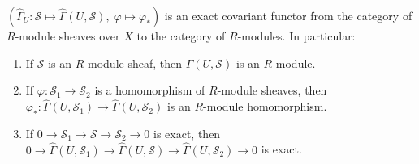 $(\hat{\Gamma}_U : \mathcal{S} \mapsto \hat{\Gamma}(U, \mathcal{S}),\; \varphi \mapsto \varphi_*)$ is an exact covariant functor from the category of $R$-module sheaves over $X$ to the category of $R$-modules. In particular:
\begin{enumerate}
\item If $\mathcal{S}$ is an $R$-module sheaf, then $\hat{\Gamma}(U, \mathcal{S})$ is an $R$-module.
\item If $\varphi : \mathcal{S}_1 \to \mathcal{S}_2$ is a homomorphism of $R$-module sheaves, then $\varphi_* : \hat{\Gamma}(U, \mathcal{S}_1) \to \hat{\Gamma}(U, \mathcal{S}_2)$ is an $R$-module homomorphism.
\item If $0 \to \mathcal{S}_1 \to \mathcal{S} \to \mathcal{S}_2 \to 0$ is exact, then $0 \to \hat{\Gamma}(U, \mathcal{S}_1) \to \hat{\Gamma}(U, \mathcal{S}) \to \hat{\Gamma}(U, \mathcal{S}_2) \to 0$ is exact.
\end{enumerate}
